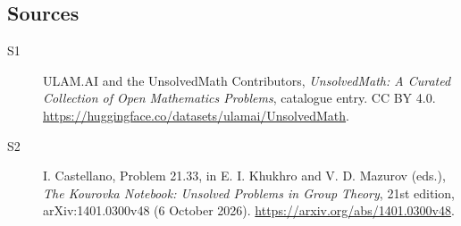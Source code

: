 \documentclass[11pt]{article}
\begin{document}
\subsection{Sources}
\begin{description}
\item[\hypertarget{source:statement:1}{S1}] ULAM.AI and the UnsolvedMath Contributors, \emph{UnsolvedMath: A Curated Collection of Open Mathematics Problems}, catalogue entry. CC BY 4.0. \url{https://huggingface.co/datasets/ulamai/UnsolvedMath}.
\item[\hypertarget{source:statement:2}{S2}] I. Castellano, Problem 21.33, in E. I. Khukhro and V. D. Mazurov (eds.), \emph{The Kourovka Notebook: Unsolved Problems in Group Theory}, 21st edition, arXiv:1401.0300v48 (6 October 2026). \url{https://arxiv.org/abs/1401.0300v48}.
\end{description}
\label{end:statement}
\end{document}
